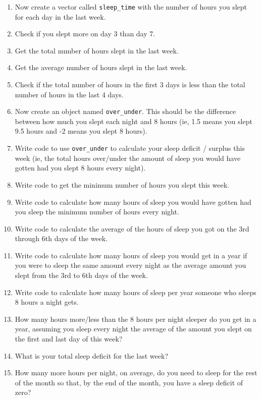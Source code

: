 \documentclass[]{book}
\begin{document}
\begin{enumerate}
\def\labelenumi{\arabic{enumi}.}
\setcounter{enumi}{28}
\item
  Now create a vector called \texttt{sleep\_time} with the number of hours you slept for each day in the last week.
\item
  Check if you slept more on day 3 than day 7.
\item
  Get the total number of hours slept in the last week.
\item
  Get the average number of hours slept in the last week.
\item
  Check if the total number of hours in the first 3 days is less than the total number of hours in the last 4 days.
\item
  Now create an object named \texttt{over\_under}. This should be the difference between how much you slept each night and 8 hours (ie, 1.5 means you slept 9.5 hours and -2 means you slept 8 hours).
\item
  Write code to use \texttt{over\_under} to calculate your sleep deficit / surplus this week (ie, the total hours over/under the amount of sleep you would have gotten had you slept 8 hours every night).
\item
  Write code to get the minimum number of hours you slept this week.
\item
  Write code to calculate how many hours of sleep you would have gotten had you sleep the minimum number of hours every night.
\item
  Write code to calculate the average of the hours of sleep you got on the 3rd through 6th days of the week.
\item
  Write code to calculate how many hours of sleep you would get in a year if you were to sleep the same amount every night as the average amount you slept from the 3rd to 6th days of the week.
\item
  Write code to calculate how many hours of sleep per year someone who sleeps 8 hours a night gets.
\item
  How many hours more/less than the 8 hours per night sleeper do you get in a year, assuming you sleep every night the average of the amount you slept on the first and last day of this week?
\item
  What is your total sleep deficit for the last week?
\item
  How many more hours per night, on average, do you need to sleep for the rest of the month so that, by the end of the month, you have a sleep deficit of zero?
\end{enumerate}
\end{document}
